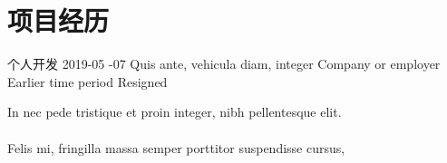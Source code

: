 \section{\kaishu 项目经历}

	{个人开发}
	{2019-05 -07}
	{}
Quis ante, vehicula diam, integer
	{Company or employer}
	{Earlier time period}
	{Resigned}

In nec pede tristique et proin integer, nibh pellentesque elit.
\\\\Felis mi, fringilla massa semper porttitor suspendisse cursus,